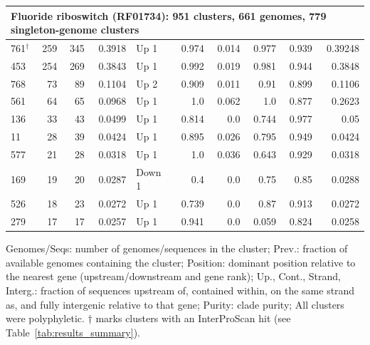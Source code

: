 \begin{longtable}{lrrrlrrrrr}
\multicolumn{10}{l}{\textbf{Fluoride riboswitch (RF01734)}: 951 clusters, 661 genomes, 779 singleton-genome clusters} \\
\hline
761$^\dagger$ & 259 & 345 & 0.3918 & Up 1 & 0.974 & 0.014 & 0.977 & 0.939 & 0.39248 \\
453 & 254 & 269 & 0.3843 & Up 1 & 0.992 & 0.019 & 0.981 & 0.944 & 0.3848 \\
768 & 73 & 89 & 0.1104 & Up 2 & 0.909 & 0.011 & 0.91 & 0.899 & 0.1106 \\
561 & 64 & 65 & 0.0968 & Up 1 & 1.0 & 0.062 & 1.0 & 0.877 & 0.2623 \\
136 & 33 & 43 & 0.0499 & Up 1 & 0.814 & 0.0 & 0.744 & 0.977 & 0.05 \\
11 & 28 & 39 & 0.0424 & Up 1 & 0.895 & 0.026 & 0.795 & 0.949 & 0.0424 \\
577 & 21 & 28 & 0.0318 & Up 1 & 1.0 & 0.036 & 0.643 & 0.929 & 0.0318 \\
169 & 19 & 20 & 0.0287 & Down 1 & 0.4 & 0.0 & 0.75 & 0.85 & 0.0288 \\
526 & 18 & 23 & 0.0272 & Up 1 & 0.739 & 0.0 & 0.87 & 0.913 & 0.0272 \\
279 & 17 & 17 & 0.0257 & Up 1 & 0.941 & 0.0 & 0.059 & 0.824 & 0.0258 \\
\end{longtable}
\endgroup

\vspace{4pt}
\noindent\footnotesize Genomes/Seqs: number of genomes/sequences in the cluster; Prev.: fraction of available genomes containing the cluster; Position: dominant position relative to the nearest gene (upstream/downstream and gene rank); Up., Cont., Strand, Interg.: fraction of sequences upstream of, contained within, on the same strand as, and fully intergenic relative to that gene; Purity: clade purity; All clusters were polyphyletic. $\dagger$ marks clusters with an InterProScan hit (see Table~\ref{tab:results_summary}).